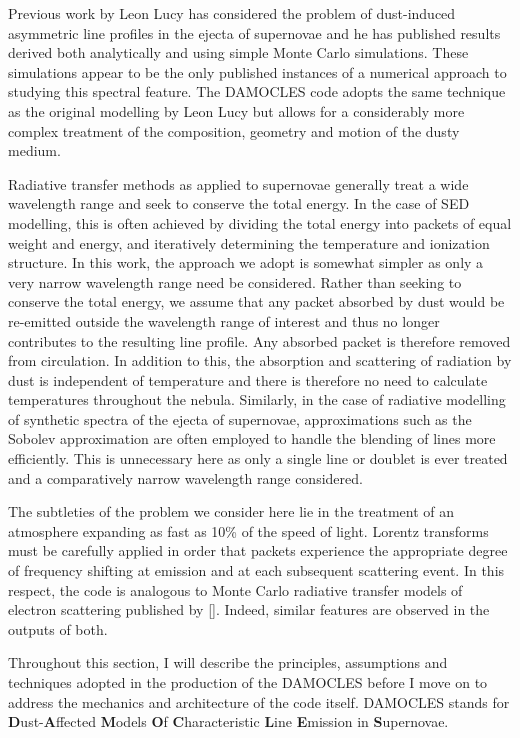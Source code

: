 Previous work by Leon Lucy has considered the problem of dust-induced asymmetric line profiles in the ejecta of supernovae and he has published results derived both analytically and using simple Monte Carlo simulations.  These simulations appear to be the only published instances of a numerical approach to studying this spectral feature.  The DAMOCLES code adopts the same technique as the original modelling by Leon Lucy but allows for a considerably more complex treatment of the composition, geometry and motion of the dusty medium.

Radiative transfer methods as applied to supernovae generally treat a wide wavelength range and seek to conserve the total energy.  In the case of SED modelling, this is often achieved by dividing the total energy into packets of equal weight and energy, and iteratively determining the temperature and ionization structure.  In this work, the approach we adopt is somewhat simpler as only a very narrow wavelength range need be considered.  Rather than seeking to conserve the total energy, we assume that any packet absorbed by dust would be re-emitted outside the wavelength range of interest and thus no longer contributes to the resulting line profile.  Any absorbed packet is therefore removed from circulation.  In addition to this, the absorption and scattering of radiation by dust is independent of temperature and there is therefore no need to calculate temperatures throughout the nebula.  Similarly, in the case of radiative modelling of synthetic spectra of the ejecta of supernovae, approximations such as the Sobolev approximation are often employed to handle the blending of lines more efficiently.  This is unnecessary here as only a single line or doublet is ever treated and a comparatively narrow wavelength range considered. 

The subtleties of the problem we consider here lie in the treatment of an atmosphere expanding as fast as 10\% of the speed of light.  Lorentz transforms must be carefully applied in order that packets experience the appropriate degree of frequency shifting at emission and at each subsequent scattering event.  In this respect, the code is analogous to Monte Carlo radiative transfer models of electron scattering published by \ref{}.  Indeed, similar features are observed in the outputs of both.

Throughout this section, I will describe the principles, assumptions and techniques adopted in the production of the DAMOCLES before I move on to address the mechanics and architecture of the code itself.  DAMOCLES stands for \textbf{D}ust-\textbf{A}ffected \textbf{M}odels \textbf{O}f \textbf{C}haracteristic \textbf{L}ine \textbf{E}mission in \textbf{S}upernovae.
 

